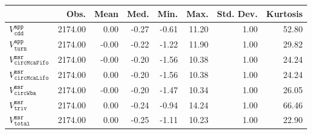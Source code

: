 \begin{tabular}{lrrrrrrr}
  \hline
 & Obs. & Mean & Med. & Min. & Max. & Std. Dev. & Kurtosis \\ 
  \hline
$V^{\mathtt{app}}_{\mathtt{cdd}}$ & 2174.00 & 0.00 & -0.27 & -0.61 & 11.20 & 1.00 & 52.80 \\ 
  $V^{\mathtt{app}}_{\mathtt{turn}}$ & 2174.00 & -0.00 & -0.22 & -1.22 & 11.90 & 1.00 & 29.82 \\ 
  $V^{\mathtt{msr}}_{\mathtt{circMcaFifo}}$ & 2174.00 & -0.00 & -0.20 & -1.56 & 10.38 & 1.00 & 24.24 \\ 
  $V^{\mathtt{msr}}_{\mathtt{circMcaLifo}}$ & 2174.00 & 0.00 & -0.20 & -1.56 & 10.38 & 1.00 & 24.24 \\ 
  $V^{\mathtt{msr}}_{\mathtt{circWba}}$ & 2174.00 & -0.00 & -0.20 & -1.47 & 10.34 & 1.00 & 26.05 \\ 
  $V^{\mathtt{msr}}_{\mathtt{triv}}$ & 2174.00 & 0.00 & -0.24 & -0.94 & 14.24 & 1.00 & 66.46 \\ 
  $V^{\mathtt{msr}}_{\mathtt{total}}$ & 2174.00 & 0.00 & -0.25 & -1.11 & 10.23 & 1.00 & 22.90 \\ 
   \hline
\end{tabular}
